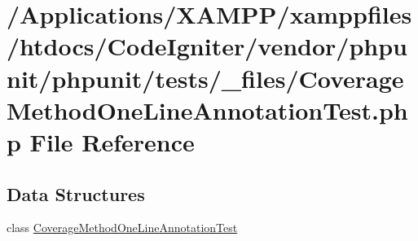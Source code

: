 \hypertarget{phpunit_2tests_2__files_2_coverage_method_one_line_annotation_test_8php}{}\section{/\+Applications/\+X\+A\+M\+P\+P/xamppfiles/htdocs/\+Code\+Igniter/vendor/phpunit/phpunit/tests/\+\_\+files/\+Coverage\+Method\+One\+Line\+Annotation\+Test.php File Reference}
\label{phpunit_2tests_2__files_2_coverage_method_one_line_annotation_test_8php}
\subsection*{Data Structures}
\begin{DoxyCompactItemize}
\item 
class \mbox{\hyperlink{class_coverage_method_one_line_annotation_test}{Coverage\+Method\+One\+Line\+Annotation\+Test}}
\end{DoxyCompactItemize}
